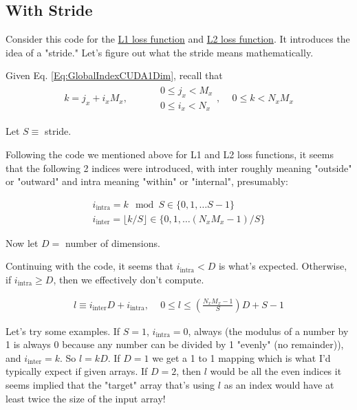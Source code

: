 \documentclass[10pt]{amsart}
\begin{document}
\begin{multicols*}{2}
\subsection{With Stride}

Consider this code for the \href{https://github.com/NVlabs/tiny-cuda-nn/blob/master/include/tiny-cuda-nn/losses/l1.h}{L1 loss function} and \href{https://github.com/NVlabs/tiny-cuda-nn/blob/master/include/tiny-cuda-nn/losses/l2.h}{L2 loss function}. It introduces the idea of a "stride." Let's figure out what the stride means mathematically.

Given Eq. \ref{Eq:GlobalIndexCUDA1Dim}, recall that
\[
\begin{gathered}
k = j_x + i_x M_x, \quad \quad \, \begin{aligned} & 0 \leq j_x < M_x \\ & 0 \leq i_x < N_x \end{aligned}, \quad \, 0 \leq k < N_x M_x
\end{gathered}
\]

Let $S \equiv $ stride. 

Following the code we mentioned above for L1 and L2 loss functions, it seems that the following 2 indices were introduced, with inter roughly meaning "outside" or "outward" and intra meaning "within" or "internal", presumably:

\[
\begin{aligned}
	i_{\text{intra}} = k \mod{S} \in \lbrace 0, 1, \dots S-1 \rbrace \\
	i_{\text{inter}} = \lfloor k/ S \rfloor \in \lbrace 0 ,1, \dots (N_x M_x - 1) / S \rbrace
\end{aligned}
\]

Now let $D= $ number of dimensions.

Continuing with the code, it seems that $i_{\text{intra}} < D$ is what's expected. Otherwise, if $i_{\text{intra}} \geq D$, then we effectively don't compute.

\[
\begin{gathered}
	l \equiv i_{\text{inter}} D + i_{\text{intra}}, \quad \, 0 \leq l \leq \left( \frac{N_x M_x - 1}{S} \right)D + S -1
\end{gathered}
\]

Let's try some examples. If $S = 1$, $i_{\text{intra}} = 0$, always (the modulus of a number by 1 is always 0 because any number can be divided by 1 "evenly" (no remainder)), and $i_{\text{inter}} = k$. So $l = kD$. If $D=1$ we get a 1 to 1 mapping which is what I'd typically expect if given arrays. If $D=2$, then $l$ would be all the even indices it seems implied that the "target" array that's using $l$ as an index would have at least twice the size of the input array!


\end{multicols*}
\end{document}

